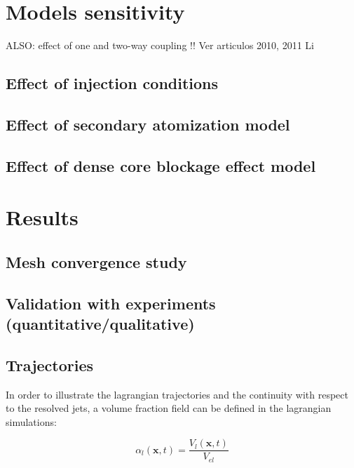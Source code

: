 \clearpage



\section{Models sensitivity}

ALSO: effect of one and two-way coupling !! Ver articulos 2010, 2011 Li 

\subsection{Effect of injection conditions}

\subsection{Effect of secondary atomization model}

\subsection{Effect of dense core blockage effect model}

\section{Results}

\subsection{Mesh convergence study}

\subsection{Validation with experiments (quantitative/qualitative)}

\subsection{Trajectories}

In order to illustrate the lagrangian trajectories and the continuity with respect to the resolved jets, a volume fraction field can be defined in the lagrangian simulations:

\begin{equation}
\alpha_l \left( \textbf{x}, t \right) = \frac{V_l \left( \textbf{x}, t \right)}{V_{el}}
\end{equation}

